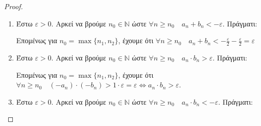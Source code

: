 \begin{proof}
  \begin{enumerate}
    \item Έστω $ \varepsilon >0 $. Αρκεί να βρούμε $ n_{0} \in \mathbb{N} $ ώστε 
      $ \forall n \geq n_{0} \quad a_{n}+b_{n} < - \varepsilon $. Πράγματι:
      Επομένως για $ n_{0}= \max \{ n_{1}, n_{2} \} $, έχουμε ότι $ \forall n \geq n_{0}
      \quad a_{n}+ b_{n} < - \frac{\varepsilon}{2} - \frac{\varepsilon}{2} = 
      \varepsilon $
    \item Έστω $ \varepsilon >0 $. Αρκεί να βρούμε $ n_{0} \in \mathbb{N} $ ώστε 
      $ \forall n \geq n_{0} \quad a_{n}\cdot b_{n} > \varepsilon $. Πράγματι:
      Επομένως για $ n_{0}= \max \{ n_{1}, n_{2} \} $, έχουμε ότι $ \forall n \geq n_{0}
      \quad (- a_{n}) \cdot (-b_{n}) >  1 \cdot \varepsilon = \varepsilon 
      \Leftrightarrow a_{n}\cdot b_{n} > \varepsilon $. 
    \item Έστω $ \varepsilon >0 $. Αρκεί να βρούμε $ n_{0} \in \mathbb{N} $ ώστε 
      $ \forall n \geq n_{0} \quad a_{n}\cdot b_{n} < - \varepsilon $. Πράγματι:
\end{enumerate}
\end{proof}
